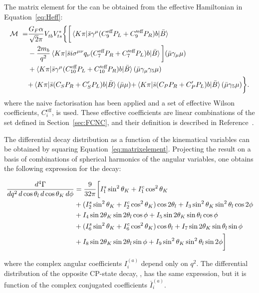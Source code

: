 The matrix element for the \BtoKstmumudecay can be obtained from the effective Hamiltonian in Equation~\ref{eq:Heff}:
\begin{equation}\label{eq:matrixelement}
  \begin{split}
    {\mathcal M}\ =& \frac{G_F\alpha}{\sqrt{2}\pi}V_{tb}^{}V_{ts}^*\bigg\{\bigg[ \braket{K \pi|\bar{s}\gamma^{\mu}({C_9^\text{eff}P_L+C_9^{\prime\text{eff}} P_R})b|\bar B} \\
      &-\frac{2m_b}{q^2}\braket{K\pi|\bar{s}i\sigma^{\mu\nu}q_{\nu}(C_7^\text{eff} P_R+C_7^{\prime\text{eff}}  P_L)b|\bar B}\bigg](\bar{\mu}\gamma_{\mu}\mu)\\
    &+ \braket{K\pi|\bar{s}\gamma^{\mu}({C_{10}^\text{eff} P_L+C_{10}^{\prime\text{eff}} P_R})b|\bar B}(\bar{\mu}\gamma_{\mu}\gamma_5 \mu) \\
    & {+\braket{K \pi|\bar{s} ({C_S P_R+C_S^\prime P_L}) b|\bar B}(\bar{\mu}\mu)}{+\braket{K \pi|\bar{s} ({C_P P_R+C_P^\prime P_L}) b|\bar B}(\bar{\mu}\gamma_5\mu)} \bigg \}.
  \end{split}
\end{equation}
where the naive factorisation has been applied and a set of effective Wilson coefficients, $C_{i}^\text{eff}$, is used.
These effective coefficients are linear combinations of the set defined in Section~\ref{sec:FCNC}, and their definition is described in Reference~\cite{Altmannshofer:2008dz}.

The differential decay distribution as a function of the kinematical variables can be obtained by squaring Equation~\ref{eq:matrixelement}.
Projecting the result on a basis of combinations of spherical harmonics of the angular variables, one obtains the following expression for the \BtoKstmumuconjdecay decay:
\begin{small}
  \begin{align} \label{eq:angulardist}
    \frac{d^4\Gamma}{dq^2\, d\cos\theta_l\, d\cos\theta_K\, d\phi} &=\frac{9}{32\pi}\bigg[ I_1^s\sin^2\theta_K + I_1^c\cos^2\theta_K \nonumber\\
      & + (I_2^s\sin^2\theta_K + I_2^c\cos^2\theta_K)\cos2\theta_l + I_3 \sin^2\theta_K \sin^2\theta_l \cos 2\phi \nonumber \\
      & + I_4 \sin 2\theta_K \sin 2\theta_l \cos\phi + I_5 \sin 2\theta_K \sin\theta_l \cos\phi \nonumber \\
      & + (I_6^s \sin^2\theta_K + {I_6^c \cos^2\theta_K})  \cos\theta_l + I_7 \sin 2\theta_K \sin\theta_l \sin\phi \nonumber \\
    & + I_8 \sin 2\theta_K \sin 2\theta_l \sin\phi + I_9 \sin^2\theta_K \sin^2\theta_l \sin 2\phi \bigg]
  \end{align}
\end{small}
where the complex angular coefficients $I_i^{(a)}$ depend only on $q^2$.
The differential distribution of the opposite CP-state decay, \BtoKstmumudecay, has the same expression, but it is function of the complex conjugated coefficients $\bar{I}_i^{(a)}$.

